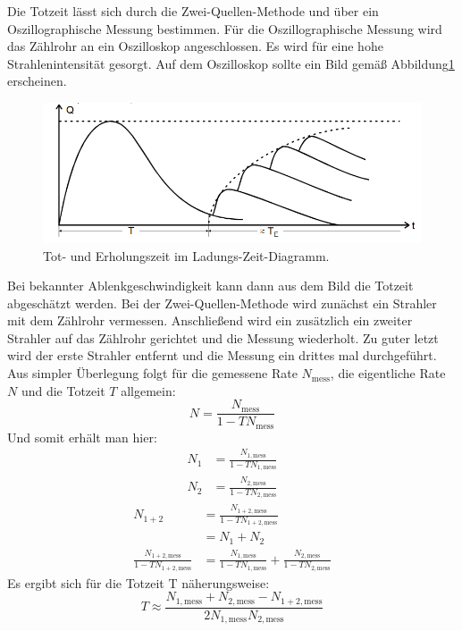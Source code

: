 Die Totzeit lässt sich durch die Zwei-Quellen-Methode und über ein Oszillographische Messung bestimmen.
Für die Oszillographische Messung wird das Zählrohr an ein Oszilloskop angeschlossen.
Es wird für eine hohe Strahlenintensität gesorgt.
Auf dem Oszilloskop sollte ein Bild gemäß Abbildung\ref{fig:osz} erscheinen.
\begin{figure}[H]
  \centering
  \includegraphics[width=\textwidth]{content/Totzeit.png}
  \caption{Tot- und Erholungszeit im Ladungs-Zeit-Diagramm.\cite{v703}}
  \label{fig:osz}
\end{figure}

Bei bekannter Ablenkgeschwindigkeit kann dann aus dem Bild die Totzeit abgeschätzt werden.
Bei der Zwei-Quellen-Methode wird zunächst ein Strahler mit dem Zählrohr vermessen. Anschließend wird ein zusätzlich ein zweiter Strahler
auf das Zählrohr gerichtet und die Messung wiederholt.
Zu guter letzt wird der erste Strahler entfernt und die Messung ein drittes mal durchgeführt.
Aus simpler Überlegung folgt für die gemessene Rate $N_\text{mess}$, die eigentliche Rate $N$ und die Totzeit $T$ allgemein:
\begin{equation}
    N = \frac{N_\text{mess}}{1-TN_\text{mess}}
\end{equation}
Und somit erhält man hier:
\begin{align}
    N_1     &= \frac{N_{1,\text{mess}}}{1-TN_{1,\text{mess}}} \\
    N_2     &= \frac{N_{2,\text{mess}}}{1-TN_{2,\text{mess}}}
\end{align}
\begin{align}
    N_{1+2} &= \frac{N_{1+2,\text{mess}}}{1-TN_{1+2,\text{mess}}} \\
            &= N_1 + N_2 \\
    \frac{N_{1+2,\text{mess}}}{1-TN_{1+2,\text{mess}}} &=\frac{N_{1,\text{mess}}}{1-TN_{1,\text{mess}}} + \frac{N_{2,\text{mess}}}{1-TN_{2,\text{mess}}}
\end{align}
Es ergibt sich für die Totzeit T näherungsweise:
\begin{equation}
    \label{eqn:totzeit}
    T \approx \frac{N_{1,\text{mess}} + N_{2,\text{mess}} - N_{1+2,\text{mess}}}{2N_{1,\text{mess}}N_{2,\text{mess}}}
\end{equation}

